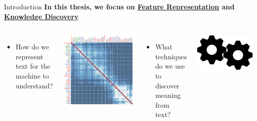 \documentclass[10pt,xcolor=table]{beamer}
\begin{document}
	
\begin{frame}{Introduction}
\large  \textbf{In this thesis, we focus on \underline{Feature Representation} and \underline{Knowledge Discovery}} \hfill


\begin{columns}
\begin{itemize}
\item[] How do we represent text for the machine to understand? 
\end{itemize}
\begin{minipage}[c][0.5\textheight][c]{\linewidth}
\centering
\includegraphics[width=.7\linewidth]{image2/Chapitre1/matrix.png}
\end{minipage}
\begin{itemize}
\item[] What techniques do we use to discover meaning from text?
\end{itemize}
\begin{minipage}[c][0.5\textheight][c]{\linewidth}
\centering
\includegraphics[width=.8\linewidth]{image2/Chapitre1/kdisc.png}
\end{minipage}
\end{columns}

\vspace{\textheight}

\end{frame}
\end{document}
